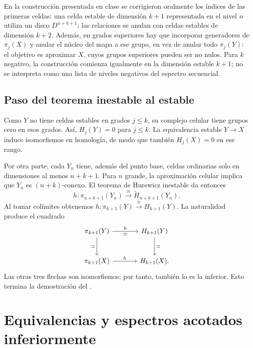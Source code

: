 \begin{nota}
En la construcción presentada en clase se corrigieron oralmente los índices de las primeras celdas: una celda estable de dimensión $k+1$ representada en el nivel $n$ utiliza un disco $D^{n+k+1}$; las relaciones se anulan con celdas estables de dimensión $k+2$. Además, en grados superiores hay que incorporar generadores de $\pi_j(X)$ y anular el núcleo del mapa a ese grupo, en vez de anular todo $\pi_j(Y)$: el objetivo es aproximar $X$, cuyos grupos superiores pueden ser no nulos. Para $k$ negativo, la construcción comienza igualmente en la dimensión estable $k+1$; no se interpreta como una lista de niveles negativos del espectro secuencial.
\end{nota}

\subsection{Paso del teorema inestable al estable}
Como $Y$ no tiene celdas estables en grados $j\leq k$, su complejo celular tiene grupos cero en esos grados. Así, $H_j(Y)=0$ para $j\leq k$. La equivalencia estable $Y\to X$ induce isomorfismos en homología, de modo que también $H_j(X)=0$ en ese rango.

Por otra parte, cada $Y_n$ tiene, además del punto base, celdas ordinarias solo en dimensiones al menos $n+k+1$. Para $n$ grande, la aproximación celular implica que $Y_n$ es $(n+k)$-conexo. El teorema de Hurewicz inestable da entonces
\[
h\colon\pi_{n+k+1}(Y_n)\xrightarrow{\cong}\widetilde H_{n+k+1}(Y_n).
\]
Al tomar colímites obtenemos $h\colon\pi_{k+1}(Y)\xrightarrow{\cong}H_{k+1}(Y)$. La naturalidad produce el cuadrado
\[
\begin{tikzcd}[column sep=large,row sep=large]
\pi_{k+1}(Y)\arrow[r,"h","\simeq"']\arrow[d,"\simeq"']&H_{k+1}(Y)\arrow[d,"\simeq"]\\
\pi_{k+1}(X)\arrow[r,"h"]&H_{k+1}(X).
\end{tikzcd}
\]
Las otras tres flechas son isomorfismos; por tanto, también lo es la inferior. Esto termina la demostración del .

\section{Equivalencias y espectros acotados inferiormente}

